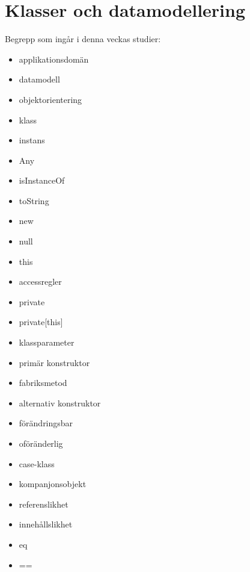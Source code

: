 \chapter{Klasser och datamodellering}\label{chapter:W05}
Begrepp som ingår i denna veckas studier:
\begin{itemize}[noitemsep,label={$\square$},leftmargin=*]
\item applikationsdomän
\item datamodell
\item objektorientering
\item klass
\item instans
\item Any
\item isInstanceOf
\item toString
\item new
\item null
\item this
\item accessregler
\item private
\item private[this]
\item klassparameter
\item primär konstruktor
\item fabriksmetod
\item alternativ konstruktor
\item förändringsbar
\item oföränderlig
\item case-klass
\item kompanjonsobjekt
\item referenslikhet
\item innehållslikhet
\item eq
\item ==\end{itemize}
